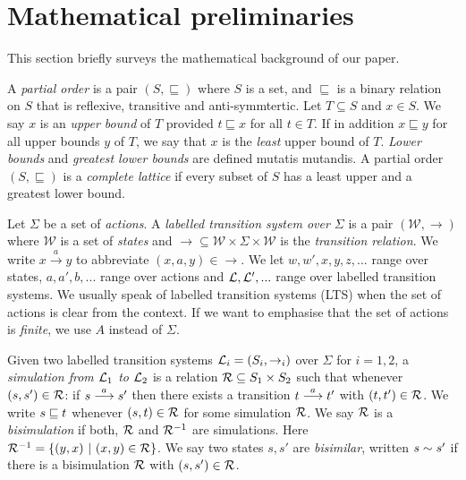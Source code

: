 \section{Mathematical preliminaries}\label{preliminaries}

\NI This section briefly surveys the mathematical background of our
paper.

\begin{definition}
A \emph{partial order} is a pair $(S, \sqsubseteq)$ where $S$ is a
set, and $\sqsubseteq$ is a binary relation on $S$ that is reflexive,
transitive and anti-symmtertic.  Let $T \subseteq S$ and $x \in S$. We
say $x$ is an \emph{upper bound} of $T$ provided $t \sqsubseteq x$ for
all $t \in T$. If in addition $x \sqsubseteq y$ for all upper bounds
$y$ of $T$, we say that $x$ is the \emph{least} upper bound of
$T$. \emph{Lower bounds} and \emph{greatest lower bounds} are defined
mutatis mutandis.  A partial order $(S, \sqsubseteq)$ is a
\emph{complete lattice} if every subset of $S$ has a least upper and a
greatest lower bound. 
\end{definition}

\begin{definition}
Let $\Sigma$ be a set of \emph{actions}.  A \emph{labelled transition
  system over $\Sigma$} is a pair $(\mathcal{W}, \rightarrow)$ where $\mathcal{W}$ is a
set of \emph{states} and $\rightarrow \subseteq \mathcal{W} \times \Sigma \times
\mathcal{W}$ is the \emph{transition relation}.  We write $x \xrightarrow{a} y$
to abbreviate $(x,a,y) \in \rightarrow$. We let $w, w', x, y,
z, ...$ range over states, $a, a', b, ...$ range over actions and
$\mathcal{L}, \mathcal{L}', ...$ range over labelled transition systems. We usually
speak of labelled transition systems (LTS) when the set of actions is
clear from the context. If we want to emphasise that the set of
actions is \emph{finite}, we use $A$ instead of $\Sigma$.
\end{definition}

\begin{definition}
Given two labelled transition systems $\mathcal{L}_i = (S_i, \rightarrow_i)$
over $\Sigma$ for $i = 1, 2$, a \emph{simulation from $\mathcal{L}_1$ to
  $\mathcal{L}_2$} is a relation $\mathcal{R} \subseteq S_1 \times S_2$ such that
whenever $(s, s') \in \mathcal{R}$: if $s \stackrel{a}{\longrightarrow} s'$ then there exists a
transition $t \stackrel{a}{\longrightarrow} t'$ with $(t, t') \in \mathcal{R}$.  We write $s \sqsubseteq
t$ whenever $(s, t) \in \mathcal{R}$ for some simulation $\mathcal{R}$.  We say
$\mathcal{R}$ is a \emph{bisimulation} if both, $\mathcal{R}$ and $\mathcal{R}^{-1}$ are
simulations. Here $\mathcal{R}^{-1} = \{(y, x)\ |\ (x, y) \in \mathcal{R}\}$.  We
say two states $s, s'$ are \emph{bisimilar}, written $s \sim s'$ if
there is a bisimulation $\mathcal{R}$ with $(s, s') \in \mathcal{R}$.
\end{definition}

